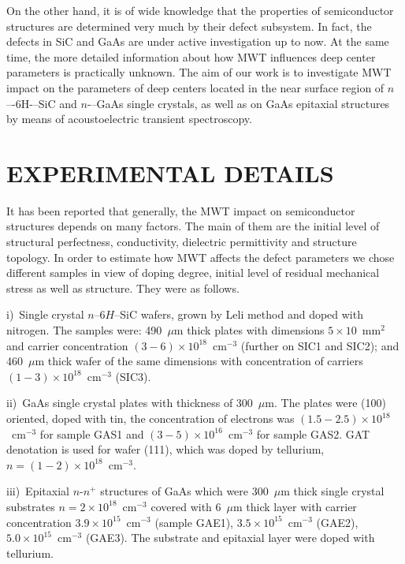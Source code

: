 \documentclass[%
 aip,jap,
 amsmath,amssymb,
 reprint,%
]{revtex4-1}
\begin{document}
On the other hand, it is of wide knowledge that the properties of semiconductor structures are determined very much by their defect subsystem.
In fact, the defects in SiC and GaAs are under active investigation up to now.
\cite{SiCDavid,SiCWei,GAPel2020,GASobolev2020}
At the same time,
the more detailed information about how MWT influences deep center parameters is practically unknown.
The aim of our work is to investigate MWT impact on the parameters of deep centers located in the near surface region of $n$–-6H-–SiC and $n$-–GaAs single crystals,
as well as on  GaAs  epitaxial structures by means of acoustoelectric  transient spectroscopy.

\section{\label{sec:Exp}EXPERIMENTAL DETAILS}

It has been reported \cite{BoltovetsEn,Milenin1994En,BelyaevIntac,ASHKINADZE1996,ProcSPIE} that generally,
the MWT impact on semiconductor structures depends on many factors.
The main of them are the initial level of structural perfectness, conductivity, dielectric permittivity and structure topology.
In order to estimate how MWT affects the defect parameters we chose different samples in view of doping degree, initial level of residual mechanical stress as well as structure.
They were as follows.

\noindent
i)~Single crystal $n$--6$H$--SiC wafers, grown by Leli method and doped with nitrogen.
   The samples were:
    490~$\mu$m thick plates with dimensions $5\times10$~mm$^2$ and  carrier concentration $(3-6)\times10^{18}$~cm$^{-3}$
    (further on SIC1 and SIC2);
    and 460~$\mu$m thick wafer of the same dimensions with concentration of carriers $(1-3)\times10^{18}$~cm$^{-3}$ (SIC3).

\noindent
ii)~GaAs single crystal plates with thickness of 300~$\mu$m.
   The plates were (100) oriented, doped with tin, the concentration of electrons was $(1.5-2.5)\times10^{18}$~cm$^{-3}$
   for sample  GAS1 and $(3-5)\times10^{16}$~cm$^{-3}$ for sample GAS2.
   GAT denotation is used for wafer (111), which was doped by tellurium,  $n = (1-2)\times10^{18}$~cm$^{-3}$.

\noindent
iii)~Epitaxial $n$-$n^+$ structures of GaAs which were 300~$\mu$m thick single crystal substrates $n = 2 \times10^{18}$~cm$^{-3}$
   covered with 6~$\mu$m thick layer with carrier concentration $3.9\times10^{15}$~cm$^{-3}$
   (sample GAE1), $3.5\times10^{15}$~cm$^{-3}$ (GAE2),
   $5.0\times10^{15}$~cm$^{-3}$ (GAE3).
   The substrate and epitaxial layer were doped with tellurium.
\end{document}
